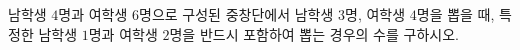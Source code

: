 \hspace*{2mm}\begin{minipage}[t]{\dimexpr\linewidth-2mm\relax}\vspace{0pt}
남학생 $4$명과 여학생 $6$명으로 구성된 중창단에서 남학생 $3$명, 여학생 $4$명을 뽑을 때, 특정한 남학생 $1$명과 여학생 $2$명을 반드시 포함하여 뽑는 경우의 수를 구하시오.\end{minipage}
